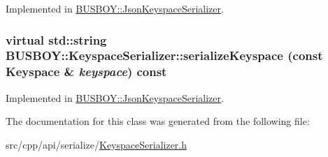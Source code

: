 Implemented in \hyperlink{classBUSBOY_1_1JsonKeyspaceSerializer_a56484d5a6fe986dc5e1cb3abcd3e8d00}{BUSBOY::JsonKeyspaceSerializer}.\hypertarget{classBUSBOY_1_1KeyspaceSerializer_a90e8c692601fcd75cd94ccc1c06b7deb}{
\subsubsection[{serializeKeyspace}]{\setlength{\rightskip}{0pt plus 5cm}virtual std::string BUSBOY::KeyspaceSerializer::serializeKeyspace (const {\bf Keyspace} \& {\em keyspace}) const}}
\label{classBUSBOY_1_1KeyspaceSerializer_a90e8c692601fcd75cd94ccc1c06b7deb}


Implemented in \hyperlink{classBUSBOY_1_1JsonKeyspaceSerializer_a563aae12209fef1d370e7a6b9cde5fe8}{BUSBOY::JsonKeyspaceSerializer}.

The documentation for this class was generated from the following file:\begin{DoxyCompactItemize}
\item 
src/cpp/api/serialize/\hyperlink{KeyspaceSerializer_8h}{KeyspaceSerializer.h}\end{DoxyCompactItemize}
